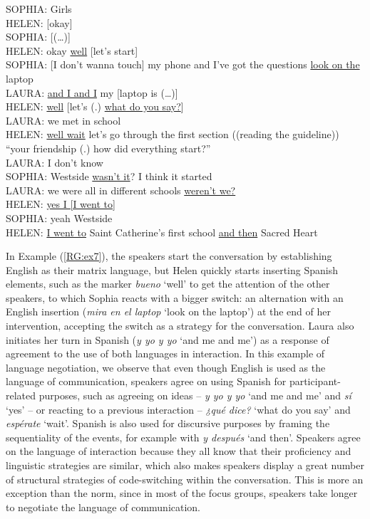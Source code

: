 \documentclass[output=paper]{langscibook}
\begin{document}
\begin{exe}
SOPHIA: Girls\\
HELEN: [okay]\\
SOPHIA: [(…)]\\
HELEN: okay \ul{well} [let’s start]\\
SOPHIA: [I don’t wanna touch] my phone and I’ve got the questions \ul{look on the} laptop\\
LAURA: \ul{and I and I} my [laptop is (…)]\\
HELEN: \ul{well} [let’s (.) \ul{what do you say?}]\\
LAURA: we met in school\\
HELEN: \ul{well wait} let’s go through the first section ((reading the guideline)) “your friendship (.) how did everything start?”\\
LAURA: I don’t know\\
SOPHIA: Westside \ul{wasn’t it}? I think it started\\
LAURA: we were all in different schools \ul{weren’t we?}\\
HELEN: \ul{yes I [I went to]}\\
SOPHIA: yeah Westside\\
HELEN: \ul{I went to} Saint Catherine’s first school \ul{and then} Sacred Heart
\end{exe}

In Example (\ref{RG:ex7}), the speakers start the conversation by establishing English as their matrix language, but Helen quickly starts inserting Spanish elements, such as the marker \textit{bueno} ‘well’ to get the attention of the other speakers, to which Sophia reacts with a bigger switch: an alternation with an English insertion (\textit{mira en el laptop} ‘look on the laptop’) at the end of her intervention, accepting the switch as a strategy for the conversation. Laura also initiates her turn in Spanish (\textit{y yo y yo} ‘and me and me’) as a response of agreement to the use of both languages in interaction. In this example of language negotiation, we observe that even though English is used as the language of communication, speakers agree on using Spanish for participant-related purposes, such as agreeing on ideas – \textit{y yo y yo} ‘and me and me’ and \textit{sí} ‘yes’ – or reacting to a previous interaction – \textit{¿qué dice?} ‘what do you say’ and \textit{espérate} ‘wait’. Spanish is also used for discursive purposes by framing the sequentiality of the events, for example with \textit{y después} ‘and then’. Speakers agree on the language of interaction because they all know that their proficiency and linguistic strategies are similar, which also makes speakers display a great number of structural strategies of code-switching within the conversation. This is more an exception than the norm, since in most of the focus groups, speakers take longer to negotiate the language of communication.
\end{document}

